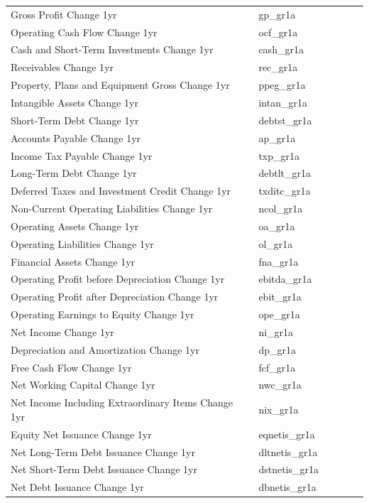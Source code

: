 \documentclass[12pt,title,fleqn]{article}
\begin{document}
\begin{longtable}{p{5cm}p{2cm}p{5cm}lll}
Gross Profit Change 1yr & gp\_gr1a & & & & \\
Operating Cash Flow Change 1yr & ocf\_gr1a & & & & \\
Cash and Short-Term Investments Change 1yr & cash\_gr1a & & & & \\
Receivables Change 1yr & rec\_gr1a & & & & \\
Property, Plans and Equipment Gross Change 1yr & ppeg\_gr1a & & & & \\
Intangible Assets Change 1yr & intan\_gr1a & & & & \\
Short-Term Debt Change 1yr & debtst\_gr1a & & & & \\
Accounts Payable Change 1yr & ap\_gr1a & & & & \\
Income Tax Payable Change 1yr & txp\_gr1a & & & & \\
Long-Term Debt Change 1yr & debtlt\_gr1a & & & & \\
Deferred Taxes and Investment Credit Change 1yr & txditc\_gr1a & & & & \\
Non-Current Operating Liabilities Change 1yr & ncol\_gr1a & & & & \\
Operating Assets Change 1yr & oa\_gr1a & & & & \\
Operating Liabilities Change 1yr & ol\_gr1a & & & & \\
Financial Assets Change 1yr & fna\_gr1a & & & & \\
Operating Profit before Depreciation Change 1yr & ebitda\_gr1a & & & & \\
Operating Profit after Depreciation Change 1yr & ebit\_gr1a & & & & \\
Operating Earnings to Equity Change 1yr & ope\_gr1a & & & & \\
Net Income Change 1yr & ni\_gr1a & & & & \\
Depreciation and Amortization Change 1yr & dp\_gr1a & & & & \\
Free Cash Flow Change 1yr & fcf\_gr1a & & & & \\
Net Working Capital Change 1yr & nwc\_gr1a & & & & \\
Net Income Including Extraordinary Items Change 1yr & nix\_gr1a & & & & \\
Equity Net Issuance Change 1yr & eqnetis\_gr1a & & & & \\
Net Long-Term Debt Issuance Change 1yr & dltnetis\_gr1a & & & & \\
Net Short-Term Debt Issuance Change 1yr & dstnetis\_gr1a & & & & \\
Net Debt Issuance Change 1yr & dbnetis\_gr1a & & & & \\

\end{longtable}
\end{document}
